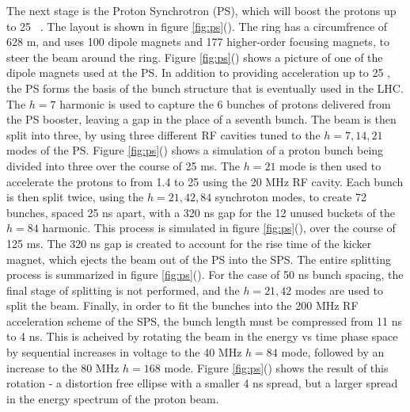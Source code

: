 \par The next stage is the Proton Synchrotron (PS), which will boost the
protons up to 25 \GeV~\cite{LHC:TDR_Vol3_InjectionChain_Benedikt}.
The layout is shown in figure \ref{fig:ps}().  
The ring has a circumfrence of 628 m, and uses 100 dipole magnets and
177 higher-order focusing magnets, to steer the beam around the ring.
Figure \ref{fig:ps}() shows a picture of one of
the dipole magnets used at the PS.  In addition to providing
acceleration up to 25 \GeV, the PS forms the basis of the bunch
structure that is eventually used in the LHC.  The $h=7$ harmonic is
used to capture the 6 bunches of protons delivered from the PS
booster, leaving a gap in the place of a seventh bunch.  The beam is
then split into three, by using three different RF cavities tuned to
the $h=7,14,21$ modes of the PS.  Figure
\ref{fig:ps}() shows a simulation of a proton
bunch being divided  into three over the course of 25 ms.  The $h=21$
mode is then used to accelerate the protons to from 1.4 to 25 \GeV
using the 20 MHz RF cavity.  Each bunch is then split twice,
using the $h=21,42,84$ synchroton modes, to create 72 bunches, spaced
25 ns apart, with a 320 ns gap for the 12 unused buckets of the $h=84$
harmonic. This process is simulated in figure
\ref{fig:ps}(), over the course of 125 ms. The
320 ns gap is created to account for the rise time of the  kicker
magnet, which ejects the beam out of the PS into the SPS.  The entire
splitting process is summarized in figure
\ref{fig:ps}().  For the case of 50 ns bunch
spacing, the final stage of splitting is not performed, and the
$h=21,42$ modes are used to split the beam.  Finally, in order to fit
the bunches into the 200 MHz RF acceleration scheme of the SPS, the 
bunch length must be compressed from 11 ns to 4 ns.  This is acheived
by rotating the beam in the energy vs time phase space by sequential
increases in voltage to the 40 MHz $h=84$ mode, followed by an
increase to the 80 MHz $h=168$ mode.  Figure
\ref{fig:ps}() shows the result of
this rotation - a distortion free ellipse with a smaller 4 ns spread,
but a larger spread in the energy spectrum of the proton beam.   

